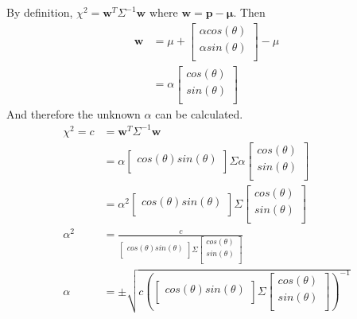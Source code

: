 \documentclass[12pt]{article}
\begin{document}
By definition, $\chi^2 = \mathbf{w}^T \Sigma^{-1} \mathbf{w}$ where $\mathbf{w} = \mathbf{p}-\mathbf{\mu}$.  Then
\begin{align*}
\mathbf{w} &= \mu +
	\left[ {\begin{smallmatrix}
	\alpha cos(\theta)  \\
	\alpha sin(\theta)  \\
 	\end{smallmatrix} } \right]
	- \mu \\
 &= \alpha \left[ {\begin{smallmatrix}
	cos(\theta)  \\
	sin(\theta)  \\
	 \end{smallmatrix} } \right]
\end{align*}
And therefore the unknown $\alpha$ can be calculated.
\begin{align*}
\chi^2 = c &=  \mathbf{w}^T \Sigma^{-1} \mathbf{w} \\
&=  \alpha \left[ {\begin{smallmatrix}
	cos(\theta)  sin(\theta)  \\
	 \end{smallmatrix} } \right]
 	\Sigma
 	\alpha \left[ {\begin{smallmatrix}
	cos(\theta)  \\
	sin(\theta)  \\
	 \end{smallmatrix} } \right] \\
&= \alpha^2 \left[ {\begin{smallmatrix}
	cos(\theta)  sin(\theta)  \\
	 \end{smallmatrix} } \right]
 	\Sigma
 	\left[ {\begin{smallmatrix}
	cos(\theta)  \\
	sin(\theta)  \\
	 \end{smallmatrix} } \right] \\
\alpha^2 &= \frac{c}{\left[ {\begin{smallmatrix}
	cos(\theta)  sin(\theta)  \\
	 \end{smallmatrix} } \right]
 	\Sigma
 	\left[ {\begin{smallmatrix}
	cos(\theta)  \\
	sin(\theta)  \\
	 \end{smallmatrix} } \right]} \\
\alpha &=\pm\sqrt{ c \left( \left[ {\begin{smallmatrix}
	cos(\theta)  sin(\theta)  \\
	 \end{smallmatrix} } \right]
 	\Sigma
 	\left[ {\begin{smallmatrix}
	cos(\theta)  \\
	sin(\theta)  \\
	 \end{smallmatrix} } \right]
	 \right)^{-1}}
\end{align*}
\end{document}
